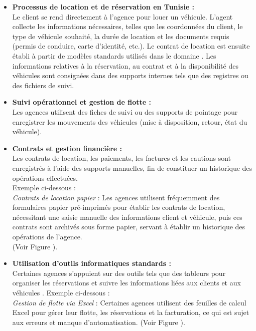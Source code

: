 \begin{itemize}[noitemsep, topsep=0pt]
    \item \textbf{Processus de location et de réservation en Tunisie  :} \\Le client se rend directement à l’agence pour louer un véhicule. L’agent collecte les informations nécessaires, telles que les coordonnées du client, le type de véhicule souhaité, la durée de location et les documents requis (permis de conduire, carte d’identité, etc.). Le contrat de location est ensuite établi à partir de modèles standards utilisés dans le domaine \cite{scribd_contrat_standard}. Les informations relatives à la réservation, au contrat et à la disponibilité des véhicules sont consignées dans des supports internes tels que des registres ou des fichiers de suivi.


    \item \textbf{Suivi opérationnel et gestion de flotte :} \\Les agences utilisent des fiches de suivi ou des supports de pointage pour enregistrer les mouvements des véhicules (mise à disposition, retour, état du véhicule).


    \item \textbf{Contrats et gestion financière :} \\Les contrats de location, les paiements, les factures et les cautions sont enregistrés à l’aide des supports manuelles, fin de constituer un historique des opérations effectuées.  
     \\Exemple ci‑dessous :
    \\ \textit{Contrats de location papier} : Les agences utilisent fréquemment des formulaires papier pré-imprimés pour établir les contrats de location, nécessitant une saisie manuelle des informations client et véhicule, puis ces contrats sont archivés sous forme papier, servant à établir un historique des opérations de l’agence. 
        \\(Voir Figure \cite{modele-contrat-location-vehicule}).




    \item \textbf{Utilisation d’outils informatiques standards :}\\ Certaines agences s’appuient sur des outils tels que des tableurs pour organiser les réservations et suivre les informations liées aux clients et aux véhicules \cite{youtube_excel_gestion}.
    Exemple ci‑dessous :
    \\ \textit{Gestion de flotte via Excel} : Certaines agences utilisent des feuilles de calcul Excel pour gérer leur flotte, les réservations et la facturation, ce qui est sujet aux erreurs et manque d'automatisation. (Voir Figure \cite{gestion-de-location-par_excel}).
\end{itemize}
